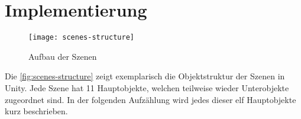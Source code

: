 \section{Implementierung}

\begin{figure}[!htbp]
	\centering
	\texttt{[image: scenes-structure]}
	\caption[Aufbau der Szenen]{Aufbau der Szenen}
	\label{fig:scenes-structure}
\end{figure}

Die \autoref{fig:scenes-structure} zeigt exemplarisch die Objektstruktur der Szenen in Unity. Jede Szene hat 11 Hauptobjekte, welchen teilweise wieder Unterobjekte zugeordnet sind. In der folgenden Aufzählung wird jedes dieser elf Hauptobjekte kurz beschrieben. 

